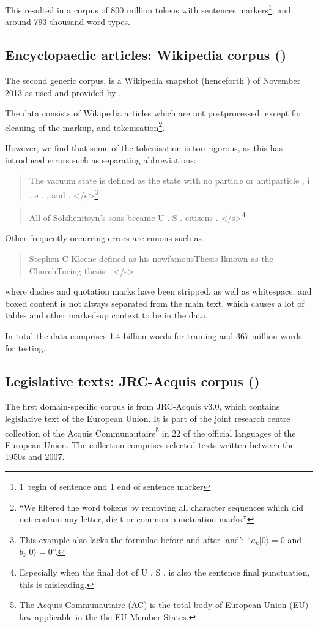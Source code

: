   This resulted in a corpus of 800 million tokens with sentences markers\footnote{1 begin of sentence and 1 end of sentence marker}, and around 793 thousand word types.
  
 \subsection{Encyclopaedic articles: Wikipedia corpus (\wp)}
  The second generic corpus, is a Wikipedia snapshot (henceforth \wp) of November 2013 as used and provided by \textcite{pickhardt2014generalized}. 
  
  The data consists of Wikipedia articles which are not postprocessed, except for cleaning of the markup, and tokenisation\footnote{``We filtered the word tokens by removing all character sequences which did not contain any letter, digit or common punctuation marks.''}.
  
  However, we find that some of the tokenisation is too rigorous, as this has introduced errors such as separating abbreviations:
  
  \begin{quote}The vacuum state is defined as the state with no particle or antiparticle , i . e . , and . </s>\footnote{This example also lacks the formulae before and after `and': ``$a_k |0\rangle=0$ and $b_k |0\rangle=0$''.}\end{quote}
  
  \begin{quote}All of Solzhenitsyn's sons became U . S . citizens . </s>\footnote{Especially when the final dot of U . S . is also the sentence final punctuation, this is misleading.}\end{quote}
  Other frequently occurring errors are runons such as 
  
  \begin{quote}Stephen C Kleene defined as his nowfamousThesis Iknown as the ChurchTuring thesis . </s>\end{quote}
  where dashes and quotation marks have been stripped, as well as whitespace; and boxed content is not always separated from the main text, which causes a lot of tables and other marked-up context to be in the data.
  
  In total the data comprises 1.4 billion words for training and 367 million words for testing.

   \subsection{Legislative texts: JRC-Acquis corpus (\jrc)}
  The first domain-specific corpus is from JRC-Acquis v3.0\cite{steinberger2006jrc}, which contains legislative text of the European Union. It is part of the joint research centre collection of the Acquis Communautaire\footnote{The Acquis Communautaire (AC) is the total body of European Union (EU) law applicable in the the EU Member States.} in 22 of the official languages of the European Union. The collection comprises selected texts written between the 1950s and 2007.
  
